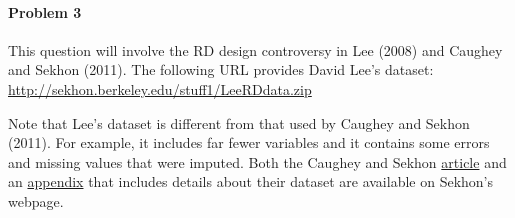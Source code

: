 \documentclass{article}
\begin{document}
\paragraph{Problem 3} 

This question will involve the RD design controversy in  Lee (2008)
and Caughey and Sekhon (2011).  The
following URL provides David Lee's dataset: 
\url{http://sekhon.berkeley.edu/stuff1/LeeRDdata.zip}

\vspace{1em}
\noindent Note that Lee's dataset is different from that used by
 Caughey and Sekhon (2011). For example, it includes far fewer
variables and it contains some errors and missing values that were
imputed. Both the Caughey and Sekhon
\href{http://sekhon.berkeley.edu/papers/CaugheySekhonRD.pdf}{article}
and an
\href{http://sekhon.berkeley.edu/papers/RDappendix.pdf}{appendix} that
includes details about their dataset are available on Sekhon's
webpage.
\end{document}
